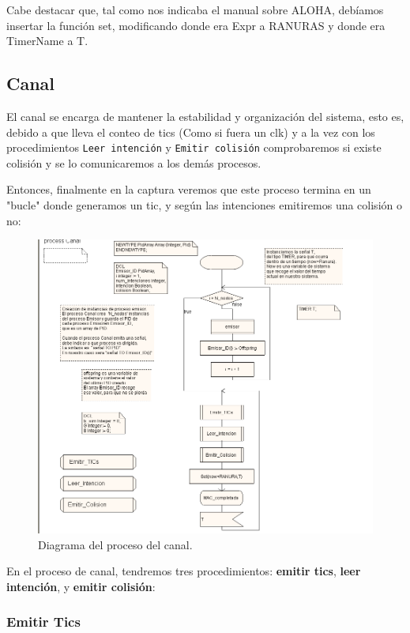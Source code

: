 \documentclass{article}
\begin{document}
\quad

Cabe destacar que, tal como nos indicaba el manual sobre ALOHA, debíamos insertar la función set, modificando donde era Expr a RANURAS y donde era TimerName a T.
\subsection{Canal}

El canal se encarga de mantener la estabilidad y organización del sistema, esto es, debido a que lleva el conteo de tics (Como si fuera un clk) y a la vez con los procedimientos \verb|Leer intención| y \verb|Emitir colisión| comprobaremos si existe colisión y se lo comunicaremos a los demás procesos.

\quad

Entonces, finalmente en la captura veremos que este proceso termina en un "bucle" donde generamos un tic, y según las intenciones emitiremos una colisión o no:

\begin{figure}[h]
    \centering
    \includegraphics[width=0.8\linewidth]{src/proceso canal.png}
    \caption{\label{fig:canalproceso} Diagrama del proceso del canal.}
\end{figure}


En el proceso de canal, tendremos tres procedimientos: \textbf{emitir tics}, \textbf{leer intención}, y \textbf{emitir colisión}:

\subsubsection{Emitir Tics}
\end{document}
